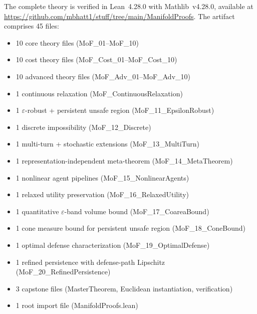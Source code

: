 \documentclass{article}
\begin{document}
The complete theory is verified in Lean~4.28.0 with Mathlib~v4.28.0,
available at
\url{https://github.com/mbhatt1/stuff/tree/main/ManifoldProofs}.
The artifact comprises 45 files:
\begin{itemize}[nosep]
  \item 10 core theory files (MoF\_01--MoF\_10)
  \item 10 cost theory files (MoF\_Cost\_01--MoF\_Cost\_10)
  \item 10 advanced theory files (MoF\_Adv\_01--MoF\_Adv\_10)
  \item 1 continuous relaxation (MoF\_ContinuousRelaxation)
  \item 1 $\varepsilon$-robust + persistent unsafe region
    (MoF\_11\_EpsilonRobust)
  \item 1 discrete impossibility (MoF\_12\_Discrete)
  \item 1 multi-turn + stochastic extensions
    (MoF\_13\_MultiTurn)
  \item 1 representation-independent meta-theorem
    (MoF\_14\_MetaTheorem)
  \item 1 nonlinear agent pipelines (MoF\_15\_NonlinearAgents)
  \item 1 relaxed utility preservation (MoF\_16\_RelaxedUtility)
  \item 1 quantitative $\varepsilon$-band volume bound
    (MoF\_17\_CoareaBound)
  \item 1 cone measure bound for persistent unsafe region
    (MoF\_18\_ConeBound)
  \item 1 optimal defense characterization
    (MoF\_19\_OptimalDefense)
  \item 1 refined persistence with defense-path Lipschitz
    (MoF\_20\_RefinedPersistence)
  \item 3 capstone files (MasterTheorem, Euclidean instantiation,
    verification)
  \item 1 root import file (ManifoldProofs.lean)
\end{itemize}
\end{document}
